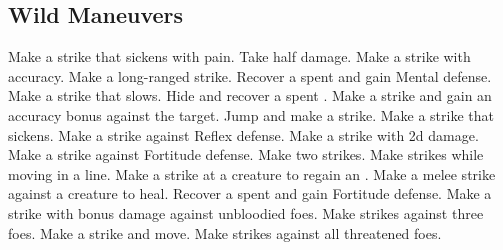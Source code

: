 \subsection{Wild Maneuvers}\label{Wild Maneuvers}
\begin{spelllist}
 Make a strike that sickens with pain.
 Take half damage.
 Make a strike with  accuracy.
 Make a long-ranged strike.
 Recover a spent  and gain  Mental defense.
 Make a strike that slows.
 Hide and recover a spent .
 Make a strike and gain an accuracy bonus against the target.
 Jump and make a strike.
 Make a strike that sickens.
 Make a strike against Reflex defense.
 Make a strike with \plus2d damage.
 Make a strike against Fortitude defense.
 Make two strikes.
 Make strikes while moving in a line.
 Make a strike at a creature to regain an .
 Make a melee strike against a creature to heal.
 Recover a spent  and gain  Fortitude defense.
 Make a strike with bonus damage against unbloodied foes.
 Make strikes against three foes.
 Make a strike and move.
 Make strikes against all threatened foes.
\end{spelllist}
